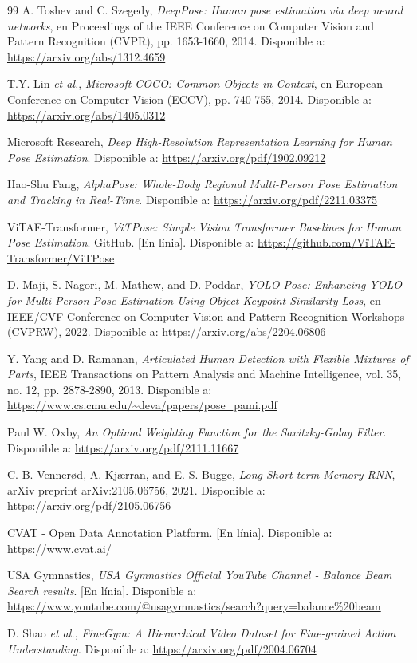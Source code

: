 \documentclass[10pt,a4paper,twocolumn,twoside]{article}
\begin{document}
\begin{thebibliography}{99}
A. Toshev and C. Szegedy, \textit{DeepPose: Human pose estimation via deep neural networks}, en Proceedings of the IEEE Conference on Computer Vision and Pattern Recognition (CVPR), pp. 1653-1660, 2014. Disponible a: \url{https://arxiv.org/abs/1312.4659}

T.Y. Lin \textit{et al.}, \textit{Microsoft COCO: Common Objects in Context}, en European Conference on Computer Vision (ECCV), pp. 740-755, 2014. Disponible a: \url{https://arxiv.org/abs/1405.0312}

Microsoft Research, \textit{Deep High-Resolution Representation Learning for Human Pose Estimation}. Disponible a: \url{https://arxiv.org/pdf/1902.09212}

Hao-Shu Fang, \textit{AlphaPose: Whole-Body Regional Multi-Person Pose Estimation and Tracking in Real-Time}. Disponible a: \url{https://arxiv.org/pdf/2211.03375}

ViTAE-Transformer, \textit{ViTPose: Simple Vision Transformer Baselines for Human Pose Estimation}. GitHub. [En línia]. Disponible a: \url{https://github.com/ViTAE-Transformer/ViTPose}

D. Maji, S. Nagori, M. Mathew, and D. Poddar, \textit{YOLO-Pose: Enhancing YOLO for Multi Person Pose Estimation Using Object Keypoint Similarity Loss}, en IEEE/CVF Conference on Computer Vision and Pattern Recognition Workshops (CVPRW), 2022. Disponible a: \url{https://arxiv.org/abs/2204.06806}

Y. Yang and D. Ramanan, \textit{Articulated Human Detection with Flexible Mixtures of Parts}, IEEE Transactions on Pattern Analysis and Machine Intelligence, vol. 35, no. 12, pp. 2878-2890, 2013. Disponible a: \url{https://www.cs.cmu.edu/~deva/papers/pose_pami.pdf}

Paul W. Oxby, \textit{An Optimal Weighting Function for the Savitzky-Golay Filter}. Disponible a: \url{https://arxiv.org/pdf/2111.11667}

C. B. Vennerød, A. Kjærran, and E. S. Bugge, \textit{Long Short-term Memory RNN}, arXiv preprint arXiv:2105.06756, 2021. Disponible a: \url{https://arxiv.org/pdf/2105.06756}

CVAT - Open Data Annotation Platform. [En línia]. Disponible a: \url{https://www.cvat.ai/}

USA Gymnastics, \textit{USA Gymnastics Official YouTube Channel - Balance Beam Search results}. [En línia]. Disponible a: \url{https://www.youtube.com/@usagymnastics/search?query=balance%20beam}

D. Shao \textit{et al.}, \textit{FineGym: A Hierarchical Video Dataset for Fine-grained Action Understanding}. Disponible a: \url{https://arxiv.org/pdf/2004.06704}

\end{thebibliography}
\end{document}
